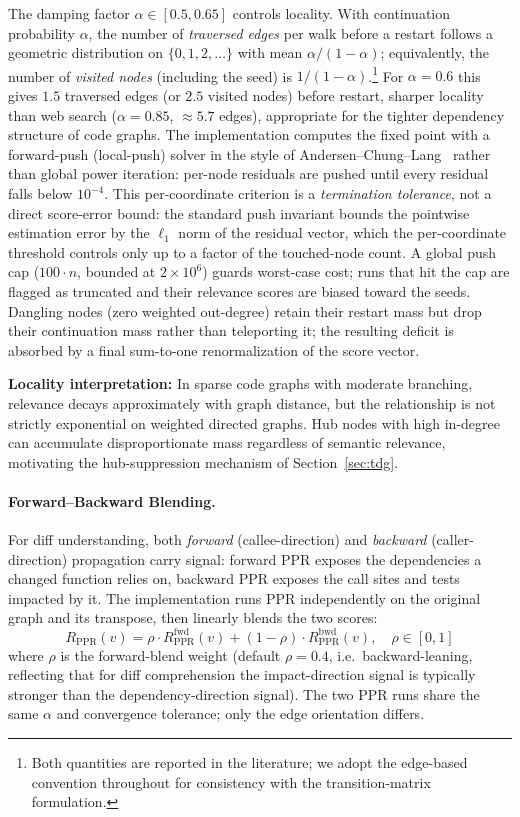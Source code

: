 \documentclass[11pt, a4paper]{article}
\begin{document}
The damping factor $\alpha \in [0.5, 0.65]$ controls locality. With continuation probability $\alpha$, the number of \emph{traversed edges} per walk before a restart follows a geometric distribution on $\{0, 1, 2, \ldots\}$ with mean $\alpha / (1 - \alpha)$; equivalently, the number of \emph{visited nodes} (including the seed) is $1/(1-\alpha)$.\footnote{Both quantities are reported in the literature; we adopt the edge-based convention throughout for consistency with the transition-matrix formulation.} For $\alpha = 0.6$ this gives $1.5$ traversed edges (or $2.5$ visited nodes) before restart, sharper locality than web search ($\alpha = 0.85$, $\approx 5.7$ edges), appropriate for the tighter dependency structure of code graphs. The implementation computes the fixed point with a forward-push (local-push) solver in the style of Andersen--Chung--Lang~\cite{andersen2006local,lofgren2014fast} rather than global power iteration: per-node residuals are pushed until every residual falls below $10^{-4}$. This per-coordinate criterion is a \emph{termination tolerance}, not a direct score-error bound: the standard push invariant bounds the pointwise estimation error by the $\ell_1$ norm of the residual vector, which the per-coordinate threshold controls only up to a factor of the touched-node count. A global push cap ($100 \cdot n$, bounded at $2 \times 10^6$) guards worst-case cost; runs that hit the cap are flagged as truncated and their relevance scores are biased toward the seeds. Dangling nodes (zero weighted out-degree) retain their restart mass but drop their continuation mass rather than teleporting it; the resulting deficit is absorbed by a final sum-to-one renormalization of the score vector.

\textbf{Locality interpretation:} In sparse code graphs with moderate branching, relevance decays approximately with graph distance, but the relationship is not strictly exponential on weighted directed graphs. Hub nodes with high in-degree can accumulate disproportionate mass regardless of semantic relevance, motivating the hub-suppression mechanism of Section~\ref{sec:tdg}.

\paragraph{Forward--Backward Blending.} For diff understanding, both \emph{forward} (callee-direction) and \emph{backward} (caller-direction) propagation carry signal: forward PPR exposes the dependencies a changed function relies on, backward PPR exposes the call sites and tests impacted by it. The implementation runs PPR independently on the original graph and its transpose, then linearly blends the two scores:
\begin{equation}
R_{\mathrm{PPR}}(v) = \rho \cdot R_{\mathrm{PPR}}^{\mathrm{fwd}}(v) + (1 - \rho) \cdot R_{\mathrm{PPR}}^{\mathrm{bwd}}(v), \quad \rho \in [0, 1]
\label{eq:ppr-blend}
\end{equation}
where $\rho$ is the forward-blend weight (default $\rho = 0.4$, i.e.\ backward-leaning, reflecting that for diff comprehension the impact-direction signal is typically stronger than the dependency-direction signal). The two PPR runs share the same $\alpha$ and convergence tolerance; only the edge orientation differs.
\end{document}
